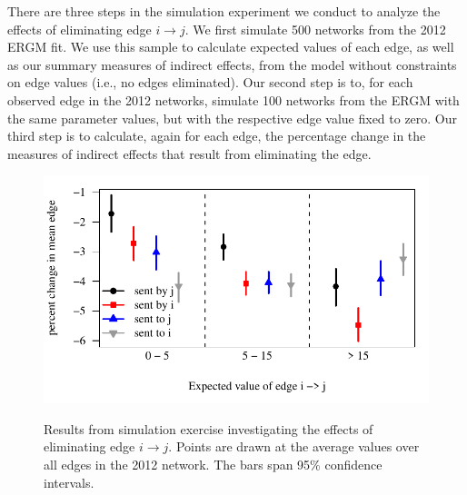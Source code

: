 \documentclass[reqno,onecolumn,letterpaper,12pt]{article}
\begin{document}
There are three steps in the simulation experiment we conduct to analyze the effects of eliminating edge $i \rightarrow j$. We first simulate 500 networks from the 2012 ERGM fit. We use this sample to calculate expected values of each edge, as well as our summary measures of indirect effects, from the model without constraints on edge values (i.e., no edges eliminated). Our second step is to, for each observed edge in the 2012 networks, simulate 100 networks from the ERGM with the same parameter values, but with the respective edge value fixed to zero. Our third step is to calculate, again for each edge, the percentage change in the measures of indirect effects that result from eliminating the edge.

\begin{figure}[!h]
\centering
\includegraphics[scale=.85]{./figures/contagion_simulation_results} \vspace{-.5cm}\\
\caption{\label{fig:contagion} Results from simulation exercise investigating the effects of eliminating edge $i \rightarrow j$. Points are drawn at the average values over all edges in the 2012 network. The bars span 95\% confidence intervals.}
\end{figure}
\end{document}
